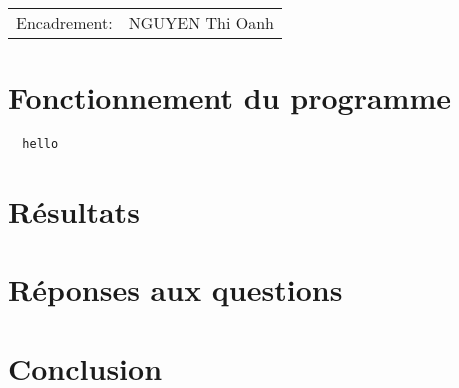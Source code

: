 \documentclass[11pt,a4paper,oneside]{report}
\author{\yourName}
\title{\yourTitle}
\begin{document}
\maketitle %

\begin{center}
\begin{tabular}{l r}
Encadrement: & NGUYEN Thi Oanh %
\end{tabular}
\end{center}


\section{Fonctionnement du programme}
\begin{lstlisting}
  hello
\end{lstlisting}

\section{Résultats}
\section{Réponses aux questions}
\section{Conclusion}
\end{document}
